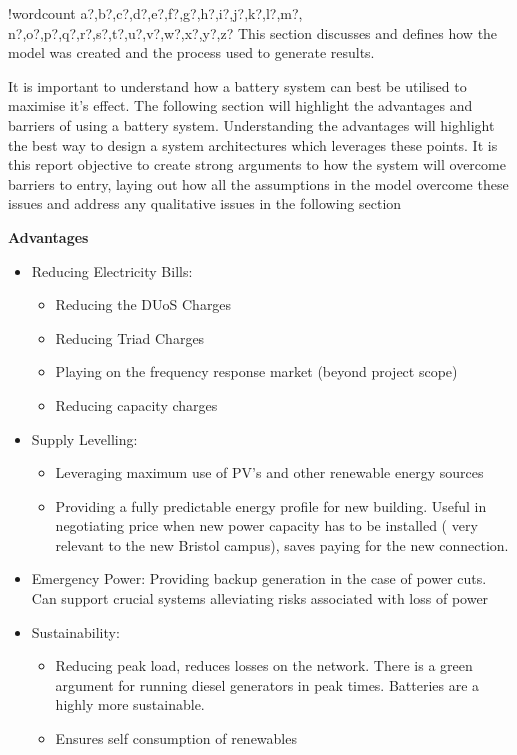 \documentclass[fontsize=9.5pt]{extarticle}
\numberwithin{figure}{section} %
\providecommand{\tightlist}{%
  \setlength{\itemsep}{0pt}\setlength{\parskip}{0pt}}
\newcounter{words}
\newenvironment{counted}{%
  \setcounter{words}{0}
  \SearchList!{wordcount}{\stepcounter{words}}
    {a?,b?,c?,d?,e?,f?,g?,h?,i?,j?,k?,l?,m?,
    n?,o?,p?,q?,r?,s?,t?,u?,v?,w?,x?,y?,z?}
  \UndoBoundary{'}
  \SearchOrder{p;}}{%
  \StopSearching}
\begin{document}
\begin{counted}
This section discusses and defines how the model was created and the
process used to generate results.

It is important to understand how a battery system can best be utilised
to maximise it's effect. The following section will highlight the
advantages and barriers of using a battery system. Understanding the
advantages will highlight the best way to design a system architectures
which leverages these points. It is this report objective to create
strong arguments to how the system will overcome barriers to entry,
laying out how all the assumptions in the model overcome these issues
and address any qualitative issues in the following section

\textbf{Advantages}

\begin{itemize}
\tightlist
\item
  Reducing Electricity Bills:

  \begin{itemize}
  \tightlist
  \item
    Reducing the DUoS Charges
  \item
    Reducing Triad Charges
  \item
    Playing on the frequency response market (beyond project scope)
  \item
    Reducing capacity charges
  \end{itemize}
\item
  Supply Levelling:

  \begin{itemize}
  \tightlist
  \item
    Leveraging maximum use of PV's and other renewable energy sources
  \item
    Providing a fully predictable energy profile for new building.
    Useful in negotiating price when new power capacity has to be
    installed ( very relevant to the new Bristol campus), saves paying
    for the new connection. \cite{wpMWMD}
  \end{itemize}
\item
  Emergency Power: Providing backup generation in the case of power
  cuts. Can support crucial systems alleviating risks associated with
  loss of power
\item
  Sustainability:

  \begin{itemize}
  \tightlist
  \item
    Reducing peak load, reduces losses on the network. There is a green
    argument for running diesel generators in peak times. Batteries are
    a highly more sustainable.
  \item
    Ensures self consumption of renewables
  \end{itemize}
\end{itemize}


\end{counted}
\end{document}
